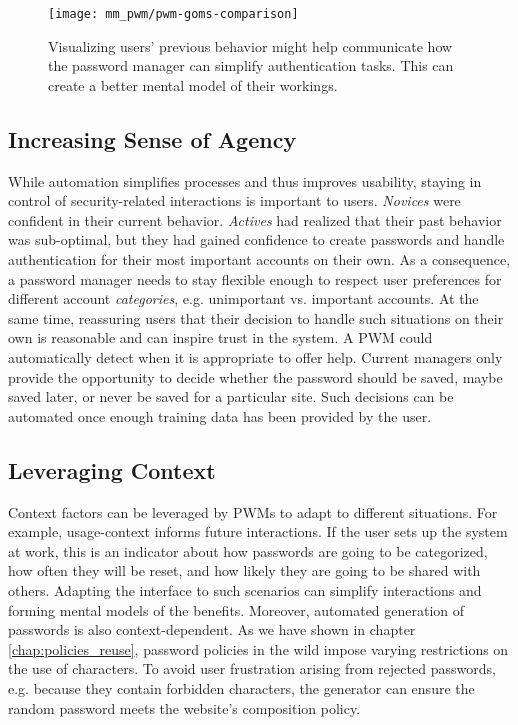 \begin{figure}%
	\centering
	\texttt{[image: mm\_pwm/pwm-goms-comparison]}
	\caption{\label{fig:mm_pwm:pwm-goms-comparison} Visualizing users' previous behavior might help communicate how the password manager can simplify authentication tasks. This can create a better mental model of their workings.}
\end{figure}


\subsection{Increasing Sense of Agency}
While automation simplifies processes and thus improves usability, staying in control of security-related interactions is important to users. \textit{Novices} were confident in their current behavior. \textit{Actives} had realized that their past behavior was sub-optimal, but they had gained confidence to create passwords and handle authentication for their most important accounts on their own. As a consequence, a password manager needs to stay flexible enough to respect user preferences for different account \textit{categories}, e.g. unimportant vs. important accounts. At the same time, reassuring users that their decision to handle such situations on their own is reasonable and can inspire trust in the system. A PWM could automatically detect when it is appropriate to offer help. Current managers only provide the opportunity to decide whether the password should be saved, maybe saved later, or never be saved for a particular site. Such decisions can be automated once enough training data has been provided by the user.

\subsection{Leveraging Context}
Context factors can be leveraged by PWMs to adapt to different situations. For example, usage-context informs future interactions. If the user sets up the system at work, this is an indicator about how passwords are going to be categorized, how often they will be reset, and how likely they are going to be shared with others. Adapting the interface to such scenarios can simplify interactions and forming mental models of the benefits. Moreover, automated generation of passwords is also context-dependent. As we have shown in chapter \ref{chap:policies_reuse}, password policies in the wild impose varying restrictions on the use of characters. To avoid user frustration arising from rejected passwords, e.g. because they contain forbidden characters, the generator can ensure the random password meets the website's composition policy. 

